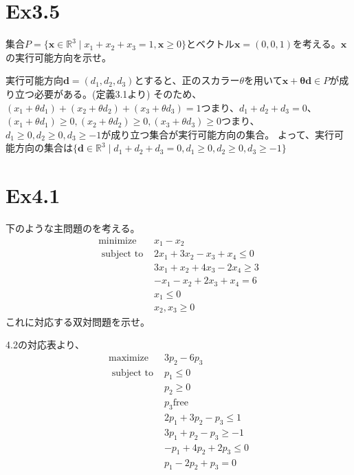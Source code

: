 \documentclass{jsarticle}
\begin{document}
\section*{Ex3.5}
集合$P=\{\bm{x}\in \mathbb{R}^3 \mid x_1+x_2+x_3=1 ,\bm{x}\geq 0\}$とベクトル$\bm{x}=(0,0,1)$を考える。$\bm{x}$の実行可能方向を示せ。
\\
 \par
実行可能方向$\bm{d}=(d_1,d_2,d_3)$とすると、正のスカラー$\theta$を用いて$\bm{x+\theta \bm{d}}\in P$が成り立つ必要がある。(定義3.1より)
そのため、$(x_1+\theta d_1)+(x_2+\theta d_2)+(x_3+\theta d_3)=1$つまり、$d_1+d_2+d_3=0$、
$(x_1+\theta d_1)\geq 0,(x_2+\theta d_2)\geq 0,(x_3+\theta d_3)\geq 0$つまり、$d_1\geq 0,d_2\geq 0,d_3\geq -1$が成り立つ集合が実行可能方向の集合。
よって、実行可能方向の集合は$\{\bm{d}\in \mathbb{R}^3\mid d_1+d_2+d_3=0,d_1\geq 0,d_2\geq 0,d_3\geq -1\}$

\section*{Ex4.1}
下のような主問題のを考える。
\begin{equation}
  \begin{array}{cc}
  \operatorname{minimize} & x_{1}-x_{2} \\
  \text { subject to } & 2 x_{1}+3 x_{2}-x_{3}+x_{4} \leq 0 \\
  & 3 x_{1}+x_{2}+4 x_{3}-2 x_{4} \geq 3 \\
  &-x_{1}-x_{2}+2 x_{3}+x_{4}=6 \\
  & x_{1} \leq 0 \\
  & x_{2}, x_{3} \geq 0
  \end{array}
\end{equation}
これに対応する双対問題を示せ。
\\
\par
4.2の対応表より、
\begin{equation}
  \begin{array}{cc}
  \operatorname{maximize} & 3p_{2}-6p_{3} \\
  \text { subject to } & p_1 \leq 0 \\
  & p_2 \geq 0\\
  & p_3 \text{free}\\
  & 2p_1+3p_2-p_3 \leq 1\\
  & 3p_1+p_2-p_3 \geq -1\\
  & -p_1+4p_2+2p_3 \leq 0\\
  & p_1-2p_2+p_3 = 0
  \end{array}
\end{equation}
\end{document}
